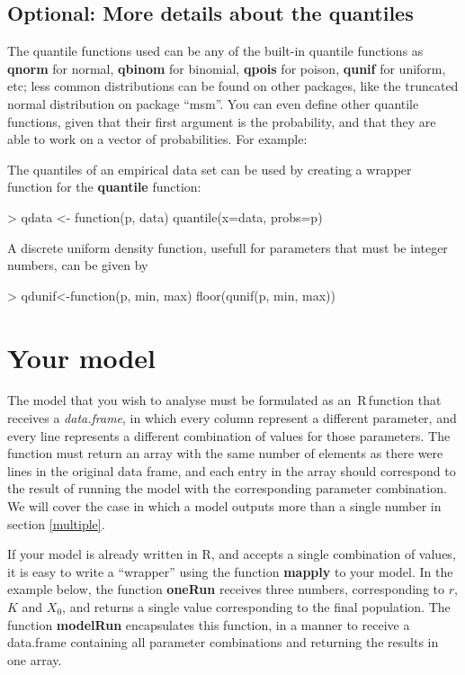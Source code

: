 \documentclass[12pt,a4paper]{article}
\newcommand{\R}{{\sf \,R\,}} %
\begin{document}
\subsection{Optional: More details about the quantiles}

The quantile functions used can be any of the built-in quantile functions as
\textbf{qnorm} for normal, \textbf{qbinom} for binomial,
\textbf{qpois} for poison, \textbf{qunif} for uniform, etc; 
less common distributions can be found on other packages, like the
truncated normal distribution on package ``msm''. You can even define
other quantile functions, given that their first argument is the probability,
and that they are able to work on a vector of probabilities.
For example:

The quantiles of an empirical data set can be used by creating
a wrapper function for the \textbf{quantile} function:
\begin{Schunk}
\begin{Sinput}
> qdata <- function(p, data) quantile(x=data, probs=p)
\end{Sinput}
\end{Schunk}

A discrete uniform density function, usefull for parameters that
must be integer numbers, can be given by
\begin{Schunk}
\begin{Sinput}
> qdunif<-function(p, min, max) floor(qunif(p, min, max))
\end{Sinput}
\end{Schunk}

\section{Your model}
The model that you wish to analyse must be formulated as an \R function that
receives a {\em data.frame}, in which every column represent a different
parameter, and every line represents a different combination of values
for those parameters. The function must return an array with the same
number of elements as there were lines in the original data frame,
and each entry in the array should correspond to the result of running
the model with the corresponding parameter combination. We will cover
the case in which a model outputs more than a single number in section
\ref{multiple}.

If your model is already written in R, and accepts a single combination
of values, it is easy to write a ``wrapper'' using the function
\textbf{mapply} to your model. In the example below, the function
\textbf{oneRun} receives three numbers, corresponding to $r$, $K$ and $X_0$,
and returns a single value corresponding to the final population.
The function \textbf{modelRun} encapsulates this function, in a manner to
receive a data.frame containing all parameter combinations and returning
the results in one array.
\end{document}
